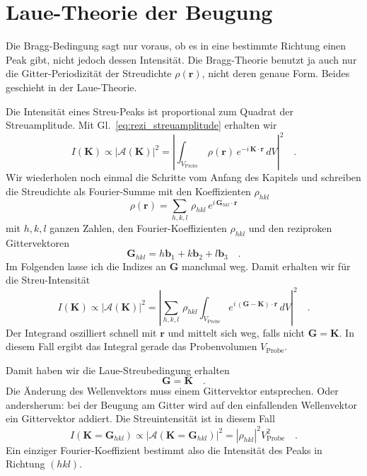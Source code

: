  
\section{Laue-Theorie der Beugung} 
 
Die Bragg-Bedingung sagt nur voraus, ob es in eine bestimmte Richtung einen Peak gibt, nicht jedoch dessen Intensität. Die Bragg-Theorie benutzt ja auch nur die Gitter-Periodizität der Streudichte $\rho( \mathbf{r})$, nicht deren genaue Form. Beides geschieht in der  Laue-Theorie.

Die Intensität eines Streu-Peaks ist proportional zum Quadrat der Streuamplitude. Mit Gl.~\ref{eq:rezi_streuamplitude} erhalten wir
\begin{equation}
I(\mathbf{K}) \propto \left| \mathcal{A}(\mathbf{K}) \right|^2 
= \left|   \int_{V_\text{Probe}} \, \rho( \mathbf{r}) \,   e^{- i \,   \mathbf{K} \cdot \mathbf{r}} \, dV \right|^2 \quad .
\end{equation}
Wir wiederholen noch einmal die Schritte vom Anfang des Kapitels und schreiben die Streudichte als Fourier-Summe mit den Koeffizienten $\rho_{hkl}$
\begin{equation}
  \rho(\mathbf{r}) = \sum_{h,k,l} \, \rho_{hkl} \, e^{i \, \mathbf{G}_{hkl} \cdot \mathbf{r}}
\end{equation}
mit $h,k,l$ ganzen Zahlen, den Fourier-Koeffizienten $\rho_{hkl}$ und den  reziproken Gittervektoren
\begin{equation}
\mathbf{G}_{hkl} = h \mathbf{b}_1 + k \mathbf{b}_2 + l \mathbf{b}_3  \quad .
\end{equation}
Im Folgenden lasse ich die Indizes an $\mathbf{G}$ manchmal weg. Damit erhalten wir für die Streu-Intensität 
\begin{equation}
I(\mathbf{K}) \propto \left| \mathcal{A}(\mathbf{K}) \right|^2 
= \left| 
 \sum_{h,k,l} \, \rho_{hkl}
  \int_{V_\text{Probe}}   e^{ i \,   (\mathbf{G}- \mathbf{K} )\cdot \mathbf{r}} \, dV \right|^2 \quad .
\end{equation}
Der Integrand oszilliert schnell mit $\mathbf{r}$ und mittelt sich weg, falls nicht $\mathbf{G} =  \mathbf{K}$. In diesem Fall ergibt das Integral gerade das Probenvolumen $V_\text{Probe}$.

Damit haben wir die  Laue-Streubedingung erhalten
\begin{equation}
\mathbf{G} =  \mathbf{K} \quad .
\end{equation}
Die Änderung des Wellenvektors muss einem Gittervektor entsprechen. Oder andersherum: bei der Beugung am Gitter wird auf den einfallenden Wellenvektor ein Gittervektor addiert.  Die Streuintensität ist in diesem Fall
\begin{equation}
I(\mathbf{K} = \mathbf{G}_{hkl} ) \propto \left| \mathcal{A}(\mathbf{K} = \mathbf{G}_{hkl} ) \right|^2 
= \left| \rho_{hkl} \right|^2   V_\text{Probe}^2  \quad . \label{eq:rezi_laue_peak}
\end{equation}
Ein einziger Fourier-Koeffizient bestimmt also die Intensität des Peaks in Richtung $(hkl)$.


